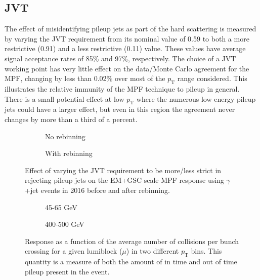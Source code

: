 \subsection{JVT}

The effect of misidentifying pileup jets as part of the hard scattering is measured by varying the JVT requirement from its nominal value of 0.59 to both a more restrictive (0.91) and a less restrictive (0.11) value.
These values have average signal acceptance rates of 85\% and 97\%, respectively.
The choice of a JVT working point has very little effect on the data/Monte Carlo agreement for the MPF, changing by less than 0.02\% over most of the $p_{\mathrm T}$ range considered.
This illustrates the relative immunity of the MPF technique to pileup in general.
There is a small potential effect at low $p_{\mathrm T}$ where the numerous low energy pileup jets could have a larger effect, but even in this region the agreement never changes by more than a third of a percent.


\begin{figure}[!ht]
  \centering
  \begin{subfigure}{.5\textwidth}
    \centering
    \caption{No rebinning}
  \end{subfigure}%
  \begin{subfigure}{.5\textwidth}  \centering
    \caption{With rebinning}
  \end{subfigure}
  \caption{Effect of varying the JVT requirement to be more/less strict in rejecting pileup jets on the EM+GSC scale MPF response using $\gamma$+jet events in 2016 before and after rebinning. }
  \label{Fig:GJetJVTEM2016}
\end{figure}

\begin{figure}[!ht]
  \centering
  \begin{subfigure}{.5\textwidth}
    \centering
    \caption{45-65 GeV}
  \end{subfigure}%
  \begin{subfigure}{.5\textwidth}
    \centering
    \caption{400-500 GeV}
  \end{subfigure}
  \caption[Response as a function of $\mu$ for two $p_{\mathrm{T}}$ bins]
  {\small Response as a function of the average number of collisions per bunch crossing for a given lumiblock ($\mu$) in two different $p_{\mathrm T}$ bins.  This quantity is a measure of both the amount of in time and out of time pileup present in the event.  } 
  \label{Fig:RespVsMUGJetEM2016}
\end{figure}


